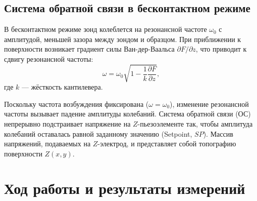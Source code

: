 \documentclass[12pt, a4paper]{article}
\begin{document}
\subsection*{Система обратной связи в бесконтактном режиме}
В бесконтактном режиме зонд колеблется на резонансной частоте $\omega_0$ с амплитудой, меньшей зазора между зондом и образцом. При приближении к поверхности возникает градиент силы Ван-дер-Ваальса $\partial F/\partial z$, что приводит к сдвигу резонансной частоты:
\begin{equation}
    \omega = \omega_0 \sqrt{1 - \frac{1}{k}\frac{\partial F}{\partial z}},
\end{equation}
где $k$ --- жёсткость кантилевера. 

Поскольку частота возбуждения фиксирована ($\omega = \omega_0$), изменение резонансной частоты вызывает падение амплитуды колебаний. Система обратной связи (ОС) непрерывно подстраивает напряжение на $Z$-пьезоэлементе так, чтобы амплитуда колебаний оставалась равной заданному значению (Setpoint, $SP$). Массив напряжений, подаваемых на $Z$-электрод, и представляет собой топографию поверхности $Z(x, y)$.












\section*{Ход работы и результаты измерений}
\end{document}
